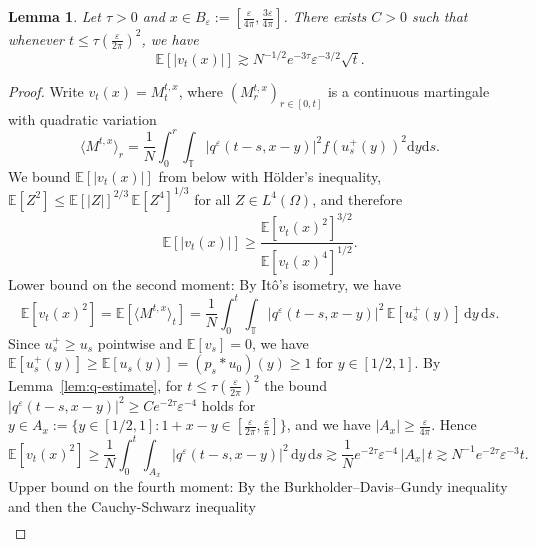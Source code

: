 \documentclass[a4paper,12pt]{article}
\newcommand{\mathd}{\mathrm{d}}
\newtheorem{lemma}[theorem]{Lemma}
\begin{document}
\begin{lemma}
    Let $\tau>0$ and $x \in B_\varepsilon:= [\frac{\varepsilon}{4 \pi}, \frac{3 \varepsilon}{4 \pi}]$. There exists $C>0$ such that whenever $t \leq \tau (\frac{\varepsilon}{2 \pi})^2$, we have 
    \begin{equation}\label{eq:v-lower-bound}
         \mathbb{E}[|v_t(x)|]\gtrsim N^{-1/2} e^{-3\tau} \varepsilon^{-3/2}\sqrt{t}.%
    \end{equation}
\end{lemma}
\begin{proof}
Write $v_t(x)=M_t^{t,x}$, where $(M^{t,x}_r)_{r \in [0,t]}$ is a continuous martingale with quadratic variation
\begin{equation}
  \langle M^{t,x} \rangle_r = \frac{1}{N}\int_0^r \int_\mathbb{T}  |q^\varepsilon(t-s,x-y)|^2 f(u_s^+(y))^2 \mathd y \mathd s.
\end{equation}
We bound $\mathbb{E}[|v_t(x)|]$ from below with H\"older's inequality,
$\mathbb{E}[Z^2]\le \mathbb{E}[|Z|]^{2/3}\,\mathbb{E}[Z^4]^{1/3}$ for all $Z \in L^4(\Omega)$, and therefore
\begin{equation}\label{eq:PZ}
    \mathbb{E}[|v_t(x)|]\geq \frac{\mathbb{E}[v_t(x)^2]^{3/2}}{\mathbb{E}[v_t(x)^4]^{1/2}}.
\end{equation}
Lower bound on the second moment: By It\^o's isometry, we have
\[
    \mathbb{E}[v_t(x)^2]=\mathbb{E}[\langle M^{t,x}\rangle_t]
    =\frac1N\int_0^t\int_\mathbb{T} |q^\varepsilon(t-s,x-y)|^2\,
    \mathbb{E}[u_s^+(y)]\,\mathd y\,\mathd s.
\]
Since $u_s^+\geq u_s$ pointwise and $\mathbb{E}[v_s]=0$, we have
$\mathbb{E}[u_s^+(y)]\geq \mathbb{E}[u_s(y)]=(p_s\ast u_0)(y)\geq 1$ for
$y\in[1/2,1]$. 
By Lemma~\ref{lem:q-estimate}, for
$t\leq \tau(\tfrac{\varepsilon}{2\pi})^2$ the bound
$|q^\varepsilon(t-s,x-y)|^2\geq C e^{-2\tau}\varepsilon^{-4}$ holds for
$y\in A_x:=\{y\in[1/2,1]:1+x-y\in[\tfrac{\varepsilon}{2\pi},\tfrac{\varepsilon}{\pi}]\}$,
and we have $|A_x|\geq\tfrac{\varepsilon}{4\pi}$. Hence
\begin{equation}\label{eq:2nd-moment}
    \mathbb{E}[v_t(x)^2]\geq \frac1N\int_0^t\int_{A_x}
    |q^\varepsilon(t-s,x-y)|^2\,\mathd y\,\mathd s
    \gtrsim \frac1N e^{-2\tau}\varepsilon^{-4}\,|A_x|\,t
    \gtrsim N^{-1}e^{-2\tau}\varepsilon^{-3}t.
\end{equation}
Upper bound on the fourth moment: By the Burkholder--Davis--Gundy inequality and then the Cauchy-Schwarz inequality
\begin{align*}

\end{align*}
\end{proof}
\end{document}
